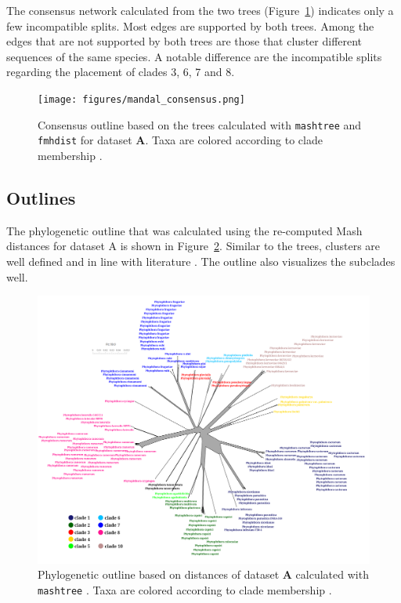 The consensus network calculated from the two trees
(Figure~\ref{fig:mandalConsensusNetwork}) indicates only a few incompatible
splits. Most edges are supported by both trees. Among the edges that are not
supported by both trees are those that cluster different sequences of the same
species. A notable difference are the incompatible splits regarding the
placement of clades 3, 6, 7 and 8.

\begin{figure}
  \centering
  \texttt{[image: figures/mandal\_consensus.png]}
  \caption[Consensus outline based on the trees calculated with
  \texttt{mashtree} and \texttt{fmhdist} for dataset \textbf{A}]{Consensus
  outline based on the trees calculated with \texttt{mashtree} and
  \texttt{fmhdist} for dataset \textbf{A}. Taxa are colored according to clade
  membership \cite{abadPhytophthoraTaxonomicPhylogenetic2023a}.}
  \label{fig:mandalConsensusNetwork}
\end{figure}

\subsection*{Outlines}
The phylogenetic outline that was calculated using the re-computed Mash
distances for dataset A is shown in Figure~\ref{fig:mandalMashOutline}. Similar
to the trees, clusters are well defined and in line with literature
\cite{abadPhytophthoraTaxonomicPhylogenetic2023a,yangExpandedPhylogenyGenus2017}.
The outline also visualizes the subclades well.

\begin{figure}
  \centering
  \includegraphics[width=1.0\textwidth]{figures/mashtree_mandal_outline_k21_s2000.png}
  \caption[Phylogenetic outline based on distances of dataset \textbf{A}
  calculated with \texttt{mashtree}]{Phylogenetic outline based on distances of
  dataset \textbf{A} calculated with
  \texttt{mashtree}
  \cite{ondovMashFastGenome2016,katzMashtreeRapidComparison2019}. Taxa are
  colored according to clade membership
  \cite{abadPhytophthoraTaxonomicPhylogenetic2023a}.}
  \label{fig:mandalMashOutline}
\end{figure}

